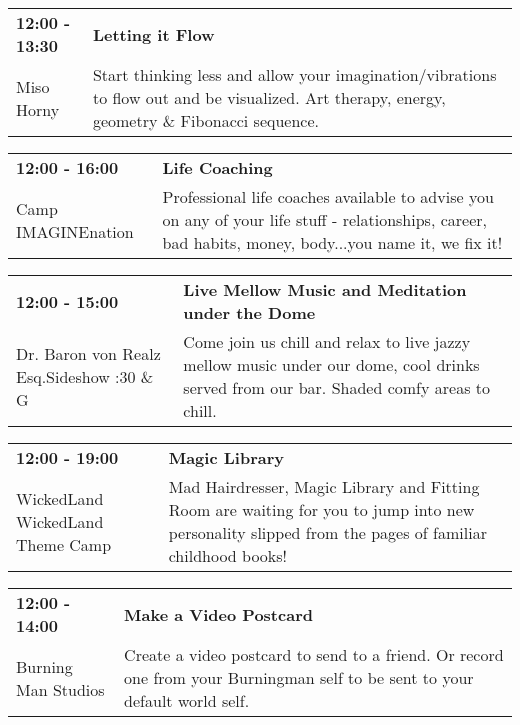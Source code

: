 \begin{tabular}{ p{1in} p{2.2in} }
    \textbf{12:00 - 13:30} & \textbf{Letting it Flow} \\
    Miso Horny \newline  & Start thinking less and allow your imagination/vibrations to flow out and be visualized. Art therapy, energy, geometry \& Fibonacci sequence. \\
    \hline 
\end{tabular}
    
\begin{tabular}{ p{1in} p{2.2in} }
    \textbf{12:00 - 16:00} & \textbf{Life Coaching} \\
    Camp IMAGINEnation \newline  & Professional life coaches available to advise you on any of your life stuff - relationships, career, bad habits, money, body...you name it, we fix it! \\
    \hline 
\end{tabular}
    
\begin{tabular}{ p{1in} p{2.2in} }
    \textbf{12:00 - 15:00} & \textbf{Live Mellow Music and Meditation under the Dome} \\
    Dr. Baron von Realz Esq.Sideshow \newline 4:30 \& G & Come join us chill and relax to live jazzy mellow music under our dome, cool drinks served from our bar. Shaded comfy areas to chill. \\
    \hline 
\end{tabular}
    
\begin{tabular}{ p{1in} p{2.2in} }
    \textbf{12:00 - 19:00} & \textbf{Magic Library} \\
    WickedLand \newline WickedLand Theme Camp & Mad Hairdresser, Magic Library and Fitting Room are waiting for you to jump into new personality slipped from the pages of familiar childhood books! \\
    \hline 
\end{tabular}
    
\begin{tabular}{ p{1in} p{2.2in} }
    \textbf{12:00 - 14:00} & \textbf{Make a Video Postcard} \\
    Burning Man Studios \newline  & Create a video postcard to send to a friend.  Or record one from your Burningman self to be sent to your default world self. \\
    \hline 
\end{tabular}
    

